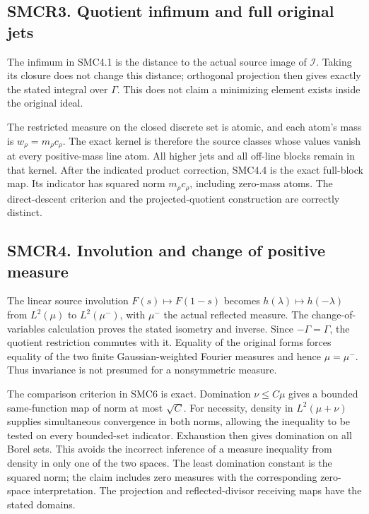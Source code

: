 \subsection{SMCR3. Quotient infimum and full original
jets}\label{smcr3.-quotient-infimum-and-full-original-jets}

The infimum in SMC4.1 is the distance to the actual source image of
\(\mathcal I\). Taking its closure does not change this distance;
orthogonal projection then gives exactly the stated integral over
\(\Gamma\). This does not claim a minimizing element exists inside the
original ideal.

The restricted measure on the closed discrete set is atomic, and each
atom's mass is \(w_\rho=m_\rho c_\rho\). The exact kernel is therefore
the source classes whose values vanish at every positive-mass line atom.
All higher jets and all off-line blocks remain in that kernel. After the
indicated product correction, SMC4.4 is the exact full-block map. Its
indicator has squared norm \(m_\rho c_\rho\), including zero-mass atoms.
The direct-descent criterion and the projected-quotient construction are
correctly distinct.

\subsection{SMCR4. Involution and change of positive
measure}\label{smcr4.-involution-and-change-of-positive-measure}

The linear source involution \(F(s)\mapsto F(1-s)\) becomes
\(h(\lambda)\mapsto h(-\lambda)\) from \(L^2(\mu)\) to \(L^2(\mu^-)\),
with \(\mu^-\) the actual reflected measure. The change-of-variables
calculation proves the stated isometry and inverse. Since
\(-\Gamma=\Gamma\), the quotient restriction commutes with it. Equality
of the original forms forces equality of the two finite
Gaussian-weighted Fourier measures and hence \(\mu=\mu^-\). Thus
invariance is not presumed for a nonsymmetric measure.

The comparison criterion in SMC6 is exact. Domination \(\nu\le C\mu\)
gives a bounded same-function map of norm at most \(\sqrt C\). For
necessity, density in \(L^2(\mu+\nu)\) supplies simultaneous convergence
in both norms, allowing the inequality to be tested on every bounded-set
indicator. Exhaustion then gives domination on all Borel sets. This
avoids the incorrect inference of a measure inequality from density in
only one of the two spaces. The least domination constant is the squared
norm; the claim includes zero measures with the corresponding zero-space
interpretation. The projection and reflected-divisor receiving maps have
the stated domains.

